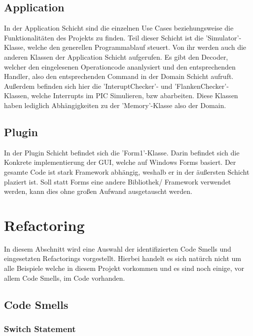 \documentclass[12pt,a4paper,titlepage,ngerman,pdftex]{report}
\begin{document}
    \subsection{Application}
    In der Application Schicht sind die einzelnen Use Cases beziehungsweise die Funktionalitäten des Projekts zu finden. Teil dieser Schicht ist die 'Simulator'- Klasse, welche den generellen Programmablauf steuert. Von ihr werden auch die anderen Klassen der Application Schicht aufgerufen.
    Es gibt den Decoder, welcher den eingelesenen Operationcode ananlysiert und den entsprechenden Handler, also den entsprechenden Command in der Domain Schicht aufruft. Außerdem befinden sich hier die 'InteruptChecker'- und 'FlankenChecker'-Klassen, welche Interrupts im PIC Simulieren, bzw abarbeiten.
    Diese Klassen haben lediglich Abhängigkeiten zu der 'Memory'-Klasse also der Domain. 

    \subsection{Plugin}
    In der Plugin Schicht befindet sich die 'Form1'-Klasse. Darin befindet sich die Konkrete implementierung der GUI, welche auf Windows Forms basiert. Der gesamte Code ist stark Framework abhängig, weshalb er in der äußersten Schicht plaziert ist.
    Soll statt Forms eine andere Bibliothek/ Framework verwendet werden, kann dies ohne großen Aufwand ausgetauscht werden.
 
    \section{Refactoring}\label{sec:refactoring}


    In diesem Abschnitt wird eine Auswahl der identifizierten Code Smells und eingesetzten Refactorings vorgestellt. Hierbei handelt es sich natürch nicht um alle Beispiele welche in diesem Projekt vorkommen und es sind noch einige, vor allem Code Smells, im Code vorhanden. 

    \subsection{Code Smells}

    \subsubsection{Switch Statement}
\end{document}
